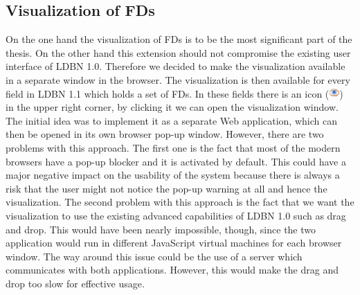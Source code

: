 \subsection{Visualization of FDs}
\label{sec:visualization}
On the one hand the visualization of FDs is to be the most significant 
part of the thesis. 
On the other hand this extension should not compromise the existing 
user interface of LDBN 1.0. Therefore we decided to
make the visualization available in a separate window in the browser. 
The visualization is then available for every field in LDBN 1.1 which 
holds a set of FDs. In these fields there is an 
icon (\includegraphics[scale=0.6]{./img/eye.png}) in the upper right
corner, by clicking it we can open the visualization window.
The initial idea
was to implement it as a separate Web application, which can then be 
opened in its own 
browser pop-up window. However, there are two problems with this approach. The first one is
the fact that most of the modern browsers have a pop-up blocker and it is activated by default.
This could have a major negative impact on the usability of the system because there
is always a risk that the user might not notice the pop-up 
warning at all and hence the visualization. The second problem with this approach is 
the fact that we want the visualization to use the existing 
advanced capabilities of LDBN 1.0 such as drag and drop. 
This would have been nearly impossible, though, since
the two application would run in different JavaScript virtual machines for each
browser window. The way around this issue could be the use of a server
which communicates with both applications. However, 
this would make the drag and drop too slow for effective usage. 

